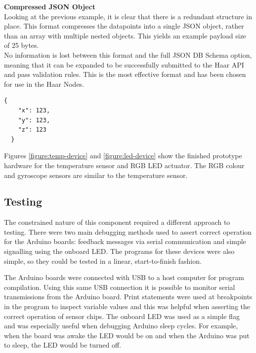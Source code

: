       \noindent
      \begin{minipage}[t]{0.45\textwidth}
        \textbf{Compressed JSON Object}\\
        Looking at the previous example, it is clear that there is a redundant structure in place. This format compresses the datapoints into a single JSON object, rather than an array with multiple nested objects. This yields an example payload size of 25 bytes.\\

        No information is lost between this format and the full JSON DB Schema option, meaning that it can be expanded to be successfully submitted to the Haar API and pass validation rules. This is the most effective format and has been chosen for use in the Haar Nodes. 
      \end{minipage}
      \hfill
      \begin{minipage}[t]{0.45\textwidth}
        \begin{lstlisting}[frame=single]
  {
    "x": 123,
    "y": 123,
    "z": 123
  }
        \end{lstlisting}
      \end{minipage}

      Figures \ref{figure:temp-device} and \ref{figure:led-device} show the finished prototype hardware for the temperature sensor and RGB LED actuator. The RGB colour and gyroscope sensors are similar to the temperature sensor. 

    \subsection{Testing}
      The constrained nature of this component required a different approach to testing. There were two main debugging methods used to assert correct operation for the Arduino boards: feedback messages via serial communication and simple signalling using the onboard LED. The programs for these devices were also simple, so they could be tested in a linear, start-to-finish fashion.

      The Arduino boards were connected with USB to a host computer for program compilation. Using this same USB connection it is possible to monitor serial transmissions from the Arduino board. Print statements were used at breakpoints in the program to inspect variable values and this was helpful when asserting the correct operation of sensor chips. The onboard LED was used as a simple flag and was especially useful when debugging Arduino sleep cycles. For example, when the board was awake the LED would be on and when the Arduino was put to sleep, the LED would be turned off.

